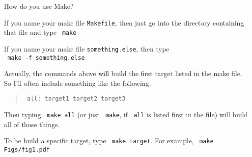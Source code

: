 \documentclass[12pt,t]{beamer}
\begin{document}
\begin{frame}[fragile]{How do you use Make?}

\vspace{6pt}

{\small
\bi
\item If you name your make file {\tt Makefile}, then just go into the
directory containing that file and type {\tt \color{hilit} make}

\item If you name your make file {\tt something.else}, then type \\
{\tt \color{hilit} make -f something.else}

\item Actually, the commands above will build the {\color{vhilit} first}
  target listed in the make file. So I'll often include something like
  the following.

\begin{quote}
{\tt \color{hilit} all: target1 target2 target3}
\end{quote}

  Then typing {\tt \color{hilit} make all} (or just {\tt
    \color{hilit} make}, if {\tt \color{hilit} all} is listed
  first in the file) will build all of those
  things.

\item To be build a specific target, type {\tt \color{hilit} make target}.
  For example, {\tt \color{hilit} make Figs/fig1.pdf}
\ei
}

\end{frame}
\end{document}

